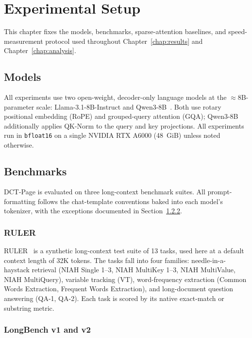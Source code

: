 \chapter{Experimental Setup}\label{chap:setup}

This chapter fixes the models, benchmarks, sparse-attention baselines,
and speed-measurement protocol used throughout
Chapter~\ref{chap:results} and Chapter~\ref{chap:analysis}.


\section{Models}\label{sec:models}

All experiments use two open-weight, decoder-only language models at
the $\approx$8B-parameter scale: Llama-3.1-8B-Instruct
\cite{grattafiori2024llama3} and Qwen3-8B~\cite{yang2025qwen3}.
Both use rotary positional embedding (RoPE) and grouped-query
attention (GQA); Qwen3-8B additionally applies QK-Norm to the query
and key projections.  All experiments run in \texttt{bfloat16} on a
single NVIDIA RTX A6000 (48~GiB) unless noted otherwise.


\section{Benchmarks}\label{sec:benchmarks}

DCT-Page is evaluated on three long-context benchmark suites.  All
prompt-formatting follows the chat-template conventions baked into
each model's tokenizer, with the exceptions documented in
Section~\ref{sec:bench-longbench}.

\subsection{RULER}\label{sec:bench-ruler}

RULER~\cite{hsieh2024ruler} is a synthetic long-context test suite of
13 tasks, used here at a default context length of 32K tokens.
The tasks fall into four families: needle-in-a-haystack retrieval
(NIAH Single 1--3, NIAH MultiKey 1--3, NIAH MultiValue, NIAH
MultiQuery), variable tracking (VT), word-frequency extraction
(Common Words Extraction, Frequent Words Extraction), and
long-document question answering (QA-1, QA-2).
Each task is scored by its native exact-match or substring metric.

\subsection{LongBench v1 and v2}\label{sec:bench-longbench}

